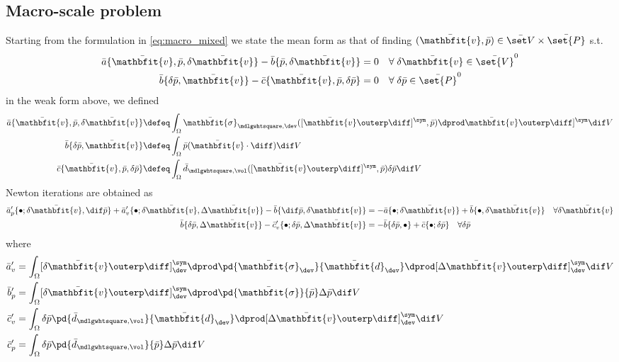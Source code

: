\documentclass[a4paper,11pt]{article}
\renewcommand{\ta}[1]{\mathbfit{#1}}
\renewcommand{\ts}[1]{\mathbfit{#1}}
\renewcommand{\Box}{\mdlgwhtsquare}
\begin{document}
\subsection{Macro-scale problem}
Starting from the formulation in \eqref{eq:macro_mixed} we state the mean form as that of finding $(\bar{\ta v},\bar p) \in \bar{\set V} \times \bar{\set{P}}$ s.t. 
\begin{align}
 \bar a\{\bar{\ta v},\bar p, \delta\bar{\ta v}\} - \bar b\{\bar p, \delta\bar{\ta v}\} &= 0   \quad \forall\; \delta\bar{\ta v} \in \bar{\set{V}}^0\\
 \bar b\{\delta\bar p, \bar{\ta v}\} - \bar c\{\bar{\ta v}, \bar p, \delta\bar p\}&= 0   \quad \forall\; \delta\bar p \in \bar{\set{P}}^0
\end{align}
in the weak form above, we defined
\begin{align}
 \bar a\{\bar{\ta v},\bar p, \delta\bar{\ta v}\} &\defeq \int_\Omega \bar{\ts\sigma}_{\Box,\dev}([\bar{\ta v}\outerp \diff]^\sym,\bar p)\dprod \bar{\ta v}\outerp \diff]^\sym \dif V \\
 \bar b\{\delta\bar p, \bar{\ta v}\}             &\defeq \int_\Omega \bar p(\bar{\ta v}\cdot\diff)\dif V \\
 \bar c\{\bar{\ta v}, \bar p, \delta\bar p\}     &\defeq \int_\Omega \bar d_{\Box,\vol}([\bar{\ta v}\outerp \diff]^\sym,\bar p)\delta\bar p\dif V
\end{align}
Newton iterations are obtained as
\begin{align}
 \bar{a}'_p\{\bullet; \delta\bar{\ta v},\dif\bar{p}\} + \bar{a}'_v\{\bullet; \delta\bar{\ta v},\Delta\bar{\ta v}\} - \bar{b}\{\dif\bar p, \delta{\ta v}\} 
	  &= -\bar{a}\{\bullet; \delta\bar{\ta v}\} + \bar{b}\{\bullet, \delta\bar{\ta v}\}\quad \forall \delta\bar{\ta v}\\
\bar{b}\{\delta\bar p, \Delta\bar{\ta v}\} - \bar{c}'_v\{\bullet; \delta\bar{p}, \Delta\bar{ \ta v}\} 
	  &= -\bar{b}\{\delta\bar{p},\bullet\} + \bar{c}\{\bullet;\delta\bar{p}\}\quad \forall \delta\bar{p}
\end{align}
where
\begin{align}
 \bar{a}'_v &= \int_\Omega [\delta\bar{\ta v}\outerp\diff]^\sym_\dev \dprod \pd{\bar{\ts\sigma}_\dev}{\bar{\ts d}_\dev} \dprod [\Delta\bar{\ta v}\outerp\diff]^\sym_\dev \dif V\\
 \bar{b}'_p &= \int_\Omega [\delta\bar{\ta v}\outerp\diff]^\sym_\dev \dprod \pd{\bar{\ts\sigma}}{\bar p} \Delta\bar{p} \dif V\\
 \bar{c}'_v &= \int_\Omega \delta\bar{p} \pd{\bar{d}_{\Box,\vol}}{\bar{\ts d}_\dev} \dprod [\Delta\bar{\ta v}\outerp\diff]^\sym_\dev \dif V\\
 \bar{c}'_p &= \int_\Omega \delta\bar{p} \pd{\bar{d}_{\Box,\vol}}{\bar p} \Delta\bar p\dif V
\end{align}
\end{document}
